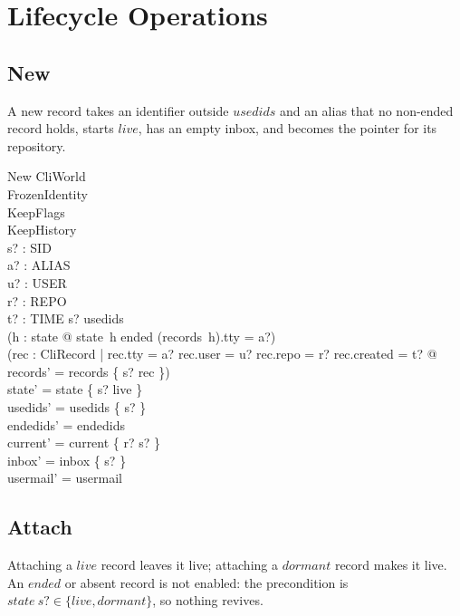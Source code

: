 \documentclass[a4paper,10pt,fleqn]{article}
\begin{document}
\section{Lifecycle Operations}

\subsection{New}

A new record takes an identifier outside $usedids$ and an alias that no
non-ended record holds, starts $live$, has an empty inbox, and becomes
the pointer for its repository.

\begin{schema}{New}
  \Delta CliWorld \\
  FrozenIdentity \\
  KeepFlags \\
  KeepHistory \\
  s? : SID \\
  a? : ALIAS \\
  u? : USER \\
  r? : REPO \\
  t? : TIME
  \where
  s? \notin usedids \\
  \lnot (\exists h : \dom state @
    state~h \neq ended \land (records~h).tty = a?) \\
  (\exists rec : CliRecord |
    rec.tty = a? \land rec.user = u? \land rec.repo = r?
      \land rec.created = t? @
    records' = records \oplus \{ s? \mapsto rec \}) \\
  state' = state \oplus \{ s? \mapsto live \} \\
  usedids' = usedids \cup \{ s? \} \\
  endedids' = endedids \\
  current' = current \oplus \{ r? \mapsto s? \} \\
  inbox' = inbox \oplus \{ s? \mapsto \emptyset \} \\
  usermail' = usermail
\end{schema}

\subsection{Attach}

Attaching a $live$ record leaves it live; attaching a $dormant$ record
makes it live.  An $ended$ or absent record is not enabled: the
precondition is $state~s? \in \{live, dormant\}$, so nothing revives.
\end{document}
